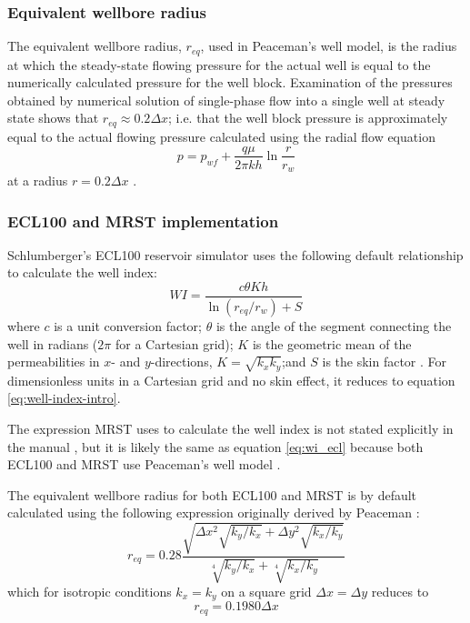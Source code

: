 \subsubsection{Equivalent wellbore radius} %
\label{ssub:equivalent_wellbore_radius}
The equivalent wellbore radius, $r_{eq}$, used in Peaceman's well model, is the radius at which the steady-state flowing pressure for the actual well is equal to the numerically calculated pressure for the well block. Examination of the pressures obtained by numerical solution of single-phase flow into a single well at steady state shows that $r_{eq} \approx 0.2 \Delta x$; i.e. that the well block pressure is approximately equal to the actual flowing pressure calculated using the radial flow equation \cite{Dake1978Developments}
\begin{equation}
    p = p_{wf} + \frac{q\mu}{2\pi kh} \ln{\frac{r}{r_w}}
\end{equation}
 at a radius $r = 0.2 \Delta x$ \cite{Peaceman1978Interpretation}.

\subsubsection{ECL100 and MRST implementation} %
\label{ssub:ecl100_implementation}
Schlumberger's ECL100 reservoir simulator uses the following default relationship to calculate the well index:
\begin{equation}
    \label{eq:wi_ecl}
    WI = \frac{c\theta K h}{\ln \left(r_{eq}/r_w\right)+S}
\end{equation}
where $c$ is a unit conversion factor; $\theta$ is the angle of the segment connecting the well in radians ($2\pi$ for a Cartesian grid); $K$ is the geometric mean of the permeabilities in $x$- and $y$-directions, $K=\sqrt{k_x k_y}$;and $S$ is the skin factor \cite{Schlumberger2013Eclipse}. For dimensionless units in a Cartesian grid and no skin effect, it reduces to equation \eqref{eq:well-index-intro}.

The expression MRST uses to calculate the well index is not stated explicitly in the manual \cite{Lie2014Introduction}, but it is likely the same as equation \eqref{eq:wi_ecl} because both ECL100 and MRST use Peaceman's well model \cite{Lie2014Introduction,Schlumberger2013Eclipse}.

The equivalent wellbore radius for both ECL100 and MRST is by default calculated using the following expression \cite{Schlumberger2013Eclipse,Lie2014Introduction} originally derived by Peaceman \cite{Peaceman1983Interpretation}:
\begin{equation}
    r_{eq} = 0.28 \frac{\sqrt{\Delta x^2 \sqrt{k_y/k_x} + \Delta y^2 \sqrt{k_x/k_y}}}{\sqrt[4]{k_y/k_x}+\sqrt[4]{k_x/k_y}}
\end{equation}
which for isotropic conditions $k_x=k_y$ on a square grid $\Delta x= \Delta y$ reduces to
\begin{equation}
    r_{eq} = 0.1980 \Delta x
\end{equation}



